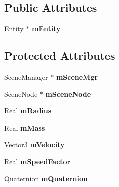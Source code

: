 \subsection*{Public Attributes}
\begin{DoxyCompactItemize}
\item 
\hypertarget{class_g_a_m_e___o_b_j_acd66a90f92e8882636e79e3f973124b4}{Entity $\ast$ {\bfseries m\-Entity}}\label{class_g_a_m_e___o_b_j_acd66a90f92e8882636e79e3f973124b4}

\end{DoxyCompactItemize}
\subsection*{Protected Attributes}
\begin{DoxyCompactItemize}
\item 
\hypertarget{class_g_a_m_e___o_b_j_a6fad18ad7aa1d24d6c1f873f3eaa0e30}{Scene\-Manager $\ast$ {\bfseries m\-Scene\-Mgr}}\label{class_g_a_m_e___o_b_j_a6fad18ad7aa1d24d6c1f873f3eaa0e30}

\item 
\hypertarget{class_g_a_m_e___o_b_j_a691482570994636e9fdf9bd9c7649f0b}{Scene\-Node $\ast$ {\bfseries m\-Scene\-Node}}\label{class_g_a_m_e___o_b_j_a691482570994636e9fdf9bd9c7649f0b}

\item 
\hypertarget{class_g_a_m_e___o_b_j_a3bf7eb6a27aa1490a05f5f00db5eed4b}{Real {\bfseries m\-Radius}}\label{class_g_a_m_e___o_b_j_a3bf7eb6a27aa1490a05f5f00db5eed4b}

\item 
\hypertarget{class_g_a_m_e___o_b_j_a7a2a13b6be28ffb215f49c915fa537e2}{Real {\bfseries m\-Mass}}\label{class_g_a_m_e___o_b_j_a7a2a13b6be28ffb215f49c915fa537e2}

\item 
\hypertarget{class_g_a_m_e___o_b_j_a7fd6c2fc09d900435bc20d590ab1170d}{Vector3 {\bfseries m\-Velocity}}\label{class_g_a_m_e___o_b_j_a7fd6c2fc09d900435bc20d590ab1170d}

\item 
\hypertarget{class_g_a_m_e___o_b_j_afe56a868207deaad652a56fb63786ebe}{Real {\bfseries m\-Speed\-Factor}}\label{class_g_a_m_e___o_b_j_afe56a868207deaad652a56fb63786ebe}

\item 
\hypertarget{class_g_a_m_e___o_b_j_a7547e49b1d6162044e1c8a5670bdf52e}{Quaternion {\bfseries m\-Quaternion}}\label{class_g_a_m_e___o_b_j_a7547e49b1d6162044e1c8a5670bdf52e}


\end{DoxyCompactItemize}
